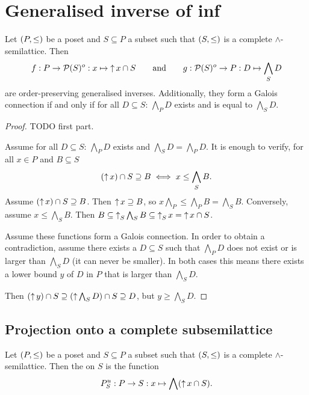 \section{Generalised inverse of inf}
\begin{proposition}
Let $\sSet{P,\leq}$ be a poset and $S\subseteq P$ a subset such that $\sSet{S,\leq}$ is a complete $\wedge$-semilattice. Then
\[ f: P \to \operatorname{\mathcal{P}}(S)^o: x\mapsto \operatorname{\uparrow} x \cap S \qquad\text{and}\qquad g: \operatorname{\mathcal{P}}(S)^o\to P: D\mapsto \bigwedge_S D \]
are order-preserving generalised inverses. Additionally, they form a Galois connection \textup{if and only if} for all $D\subseteq S$: $\bigwedge_P D$ exists and is equal to $\bigwedge_S D$.
\end{proposition}
\begin{proof}
TODO first part.

Assume for all $D\subseteq S$: $\bigwedge_P D$ exists and $\bigwedge_S D = \bigwedge_P D$. It is enough to verify, for all $x\in P$ and $B\subseteq S$
\[ (\operatorname{\uparrow} x)\cap S \supseteq B \iff x\leq \bigwedge_S B. \]
Assume $(\operatorname{\uparrow} x)\cap S \supseteq B$. Then $\operatorname{\uparrow} x \supseteq B$, so $x \bigwedge_P \leq \bigwedge_P B = \bigwedge_S B$. Conversely, assume $x\leq \bigwedge_S B$. Then $B\subseteq \operatorname{\uparrow}_S\bigwedge_S B \subseteq \operatorname{\uparrow}_S x = \operatorname{\uparrow} x\cap S$.

Assume these functions form a Galois connection. In order to obtain a contradiction, assume there exists a $D\subseteq S$ such that $\bigwedge_P D$ does not exist or is larger than $\bigwedge_S D$ (it can never be smaller). In both cases this means there exists a lower bound $y$ of $D$ in $P$ that is larger than $\bigwedge_S D$.

Then $(\operatorname{\uparrow} y)\cap S \supseteq (\operatorname{\uparrow} \bigwedge_S D)\cap S \supseteq D$, but $y\geq \bigwedge_S D$.
\end{proof}

\subsection{Projection onto a complete subsemilattice}
\begin{definition}
Let $\sSet{P,\leq}$ be a poset and $S\subseteq P$ a subset such that $\sSet{S,\leq}$ is a complete $\wedge$-semilattice. Then the  on $S$ is the function
\[ P_S^u: P \to S: x\mapsto \bigwedge(\operatorname{\uparrow} x\cap S). \]
\end{definition}

